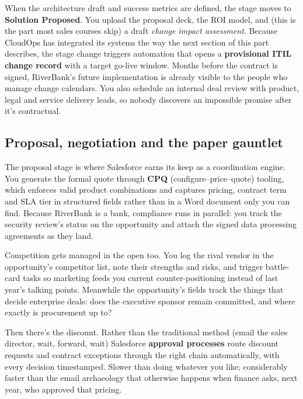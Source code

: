 When the architecture draft and success metrics are defined, the stage moves to \textbf{Solution Proposed}. You upload the proposal deck, the ROI model, and (this is the part most sales courses skip) a draft \emph{change impact assessment}. Because CloudOps has integrated its systems the way the next section of this part describes, the stage change triggers automation that opens a \textbf{provisional ITIL change record} with a target go-live window. Months before the contract is signed, RiverBank's future implementation is already visible to the people who manage change calendars. You also schedule an internal deal review with product, legal and service delivery leads, so nobody discovers an impossible promise after it's contractual.



\subsection{Proposal, negotiation and the paper gauntlet}


The proposal stage is where Salesforce earns its keep as a coordination engine. You generate the formal quote through \textbf{CPQ} (configure–price–quote) tooling, which enforces valid product combinations and captures pricing, contract term and SLA tier in structured fields rather than in a Word document only you can find. Because RiverBank is a bank, compliance runs in parallel: you track the security review's status on the opportunity and attach the signed data processing agreements as they land.


Competition gets managed in the open too. You log the rival vendor in the opportunity's competitor list, note their strengths and risks, and trigger battle-card tasks so marketing feeds you current counter-positioning instead of last year's talking points. Meanwhile the opportunity's fields track the things that decide enterprise deals: does the executive sponsor remain committed, and where exactly is procurement up to?


Then there's the discount. Rather than the traditional method (email the sales director, wait, forward, wait) Salesforce \textbf{approval processes} route discount requests and contract exceptions through the right chain automatically, with every decision timestamped. Slower than doing whatever you like; considerably faster than the email archaeology that otherwise happens when finance asks, next year, who approved that pricing.




